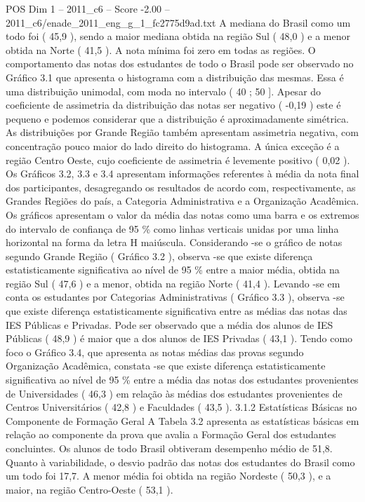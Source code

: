 \begin{textsample}{POS Dim 1 – 2011\_c6 – Score -2.00 – 2011\_c6/enade\_2011\_eng\_g\_1\_fc2775d9ad.txt}
A mediana do Brasil como um todo foi ( 45,9 ), sendo a maior mediana obtida na região Sul ( 48,0 ) e a menor obtida na Norte ( 41,5 ).
A nota mínima foi zero em todas as regiões.
O comportamento das notas dos estudantes de todo o Brasil pode ser observado no Gráfico 3.1 que apresenta o histograma com a distribuição das mesmas.
Essa é uma distribuição unimodal, com moda no intervalo ( 40 ; 50 ].
Apesar do coeficiente de assimetria da distribuição das notas ser negativo ( -0,19 ) este é pequeno e podemos considerar que a distribuição é aproximadamente simétrica.
As distribuições por Grande Região também apresentam assimetria negativa, com concentração pouco maior do lado direito do histograma.
A única exceção é a região Centro Oeste, cujo coeficiente de assimetria é levemente positivo ( 0,02 ).
Os Gráficos 3.2, 3.3 e 3.4 apresentam informações referentes à média da nota final dos participantes, desagregando os resultados de acordo com, respectivamente, as Grandes Regiões do país, a Categoria Administrativa e a Organização Acadêmica.
Os gráficos apresentam o valor da média das notas como uma barra e os extremos do intervalo de confiança de 95 \% como linhas verticais unidas por uma linha horizontal na forma da letra H maiúscula.
Considerando -se o gráfico de notas segundo Grande Região ( Gráfico 3.2 ), observa -se que existe diferença estatisticamente significativa ao nível de 95 \% entre a maior média, obtida na região Sul ( 47,6 ) e a menor, obtida na região Norte ( 41,4 ).
Levando -se em conta os estudantes por Categorias Administrativas ( Gráfico 3.3 ), observa -se que existe diferença estatisticamente significativa entre as médias das notas das IES Públicas e Privadas.
Pode ser observado que a média dos alunos de IES Públicas ( 48,9 ) é maior que a dos alunos de IES Privadas ( 43,1 ).
Tendo como foco o Gráfico 3.4, que apresenta as notas médias das provas segundo Organização Acadêmica, constata -se que existe diferença estatisticamente significativa ao nível de 95 \% entre a média das notas dos estudantes provenientes de Universidades ( 46,3 ) em relação às médias dos estudantes provenientes de Centros Universitários ( 42,8 ) e Faculdades ( 43,5 ). 3.1.2 Estatísticas Básicas no Componente de Formação Geral A Tabela 3.2 apresenta as estatísticas básicas em relação ao componente da prova que avalia a Formação Geral dos estudantes concluintes.
Os alunos de todo Brasil obtiveram desempenho médio de 51,8.
Quanto à variabilidade, o desvio padrão das notas dos estudantes do Brasil como um todo foi 17,7.
A menor média foi obtida na região Nordeste ( 50,3 ), e a maior, na região Centro-Oeste ( 53,1 ).

\end{textsample}
